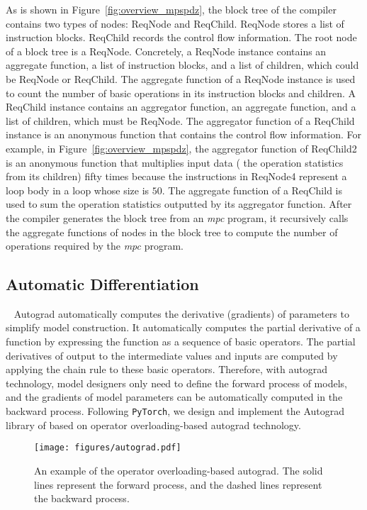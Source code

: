 As is shown in Figure~\ref{fig:overview_mpspdz}, the block tree of the \mpspdz compiler contains two types of nodes: ReqNode and ReqChild. ReqNode stores a list of instruction blocks. ReqChild records the control flow information. The root node of a block tree is a ReqNode. Concretely, a ReqNode instance contains an aggregate function, a list of instruction blocks, and a list of children, which could be ReqNode or ReqChild. The aggregate function of a ReqNode instance is used to count the number of basic operations in its instruction blocks and children. A ReqChild instance contains an aggregator function, an aggregate function, and a list of children, which must be ReqNode. The aggregator function of a ReqChild instance is an anonymous function that contains the control flow information. For example, in Figure~\ref{fig:overview_mpspdz}, the aggregator function of ReqChild2 is an anonymous function that multiplies input data ( the operation statistics from its children) fifty times because the instructions in ReqNode4 represent a loop body in a loop whose size is $50$. The aggregate function of a ReqChild is used to sum the operation statistics outputted by its aggregator function. After the \mpspdz compiler generates the block tree from an \textit{mpc} program, it recursively calls the aggregate functions of nodes in the block tree to compute the number of operations required by the \textit{mpc} program. 

\subsection{Automatic Differentiation}~\label{subsec:pre_autograd}
Autograd automatically computes the derivative (gradients) of parameters to simplify model construction. It automatically computes the partial derivative of a function by expressing the function as a sequence of basic operators. The partial derivatives of output to the intermediate values and inputs are computed by applying the chain rule to these basic operators. Therefore, with autograd technology, model designers only need to define the forward process of models, and the gradients of model parameters can be automatically computed in the backward process. Following \texttt{PyTorch}, we design and implement the Autograd library of \hawkeye based on operator overloading-based autograd technology. 

\begin{figure}[htbp]
    \centering
    \texttt{[image: figures/autograd.pdf]}
    \caption{An example of the operator overloading-based autograd. The solid lines represent the forward process, and the dashed lines represent the backward process.}
    \label{fig:augograd}
\end{figure}


